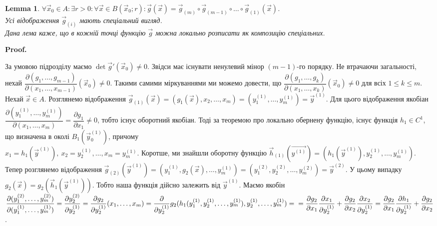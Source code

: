 \documentclass[a4paper, 10pt]{article}
\makeatletter
\def\qed{$\blacksquare$}
\theoremstyle{theoremdd}
\theoremstyle{theoremdd}
\theoremstyle{theoremdd}
\theoremstyle{theoremdd}
\theoremstyle{theoremdd}
\theoremstyle{theoremdd}
\theoremstyle{theoremdd}
\theoremstyle{theoremdd}
\theoremstyle{theoremdd}
\theoremstyle{theoremdd}
\theoremstyle{theoremdd}
\theoremstyle{theoremdd}
\theoremstyle{theoremdd}
\newtheorem{lemma}[theorem]{Lemma}
\theoremstyle{theoremdd}
\theoremstyle{theoremdd}
\renewenvironment{proof}[1][Proof.\\]{\par
\pushQED{\hfill \qed}%
\normalfont \topsep6\p@\@plus6\p@\relax
\trivlist
\item\relax
{\bfseries
#1\@addpunct{.}}\hspace\labelsep\ignorespaces
}{%
\popQED\endtrivlist\@endpefalse
}
\makeatother
\begin{document}
\begin{lemma}
$\forall \vec{x}_0 \in A: \exists r > 0: \forall \vec{x} \in B(\vec{x}_0;r): \vec{g}(\vec{x}) = \vec{g}_{(m)} \circ \vec{g}_{(m-1)} \circ \dots \circ \vec{g}_{(1)}(\vec{x})$.\\
Усі відображення $\vec{g}_{(i)}$ мають спеціальний вигляд.\\
Дана лема каже, що в кожній точці функцію $\vec{g}$ можна локально розписати як композицію спеціальних.
\end{lemma}

\begin{proof}
За умовою підрозділу маємо $\det \vec{g}\prime(\vec{x}_0) \neq 0$. Звідси має існувати ненулевий мінор $(m-1)$-го порядку. Не втрачаючи загальності, нехай $\dfrac{\partial(g_1,\dots,g_{m-1})}{\partial(x_1,\dots,x_{m-1})}(\vec{x}_0) \neq 0$. Такими самими міркуваннями ми можемо довести, що $\dfrac{\partial(g_1,\dots,g_k)}{\partial(x_1,\dots,x_k)}(\vec{x}_0) \neq 0$ для всіх $1 \leq k \leq m$.\\
Нехай $\vec{x} \in A$. Розглянемо відображення $\vec{g}_{(1)}(\vec{x}) = (g_1(\vec{x}), x_2,\dots,x_m) = (y_1^{(1)}, \dots, y_m^{(1)}) = \vec{y}^{(1)}$. Для цього відображення якобіан $\dfrac{\partial(y_1^{(1)},\dots,y_m^{(1)})}{\partial(x_1,\dots,x_m)} = \dfrac{\partial g_1}{\partial x_1} \neq 0$, тобто існує оборотний якобіан. Тоді за теоремою про локально обернену функцію, існує функція $h_1 \in C^1$, що визначена в околі $B_1(\vec{y}_0^{(1)})$, причому\\
$x_1 = h_1(\vec{y}^{(1)}),\ x_2 = y_2^{(1)}, \dots, x_m = y_m^{(1)}$. Коротше, ми знайшли оборотну функцію $\vec{h}_{(1)}(\vec{y^{(1)}}) = (h_1(\vec{y}^{(1)}), y_2^{(1)},\dots,y_m^{(1)})$.\\
Тепер розглянемо відображення $\vec{g}_{(2)}(\vec{y}^{(1)}) = (y_1^{(1)}, g_2(\vec{x}), \dots, y_m^{(1)}) = (y_1^{(2)},y_2^{(2)},\dots,y_m^{(2)}) = \vec{y}^{(2)}$. У цьому випадку $g_2(\vec{x}) = g_2(\vec{h}_1(\vec{y}^{(1)}))$. Тобто наша функція дійсно залежить від $\vec{y}^{(1)}$. Маємо якобін $\dfrac{\partial(y_1^{(2)},\dots,y_m^{(2)})}{\partial(y_1^{(1)},\dots,y_m^{(1)})} = \dfrac{\partial y_2^{(2)}}{\partial y_2^{(1)}} = \dfrac{\partial g_2}{\partial y_2^{(1)}} (x_1,\dots,x_m) = \dfrac{\partial}{\partial y_2^{(1)}} g_2(h_1(y_1^{(1)},y_2^{(1)},\dots,y_m^{(1)}),y_2^{(1)},\dots,y_m^{(1)}) = \\
= \dfrac{\partial g_2}{\partial x_1} \dfrac{\partial x_1}{\partial y_2^{(1)}} + \dfrac{\partial g_2}{\partial x_2} \dfrac{\partial x_2}{\partial y_2^{(1)}} = \dfrac{\partial g_2}{\partial x_1} \dfrac{\partial h_1}{\partial y_2^{(1)}} + \dfrac{\partial g_2}{\partial x_2}$.\\

\end{proof}
\end{document}
